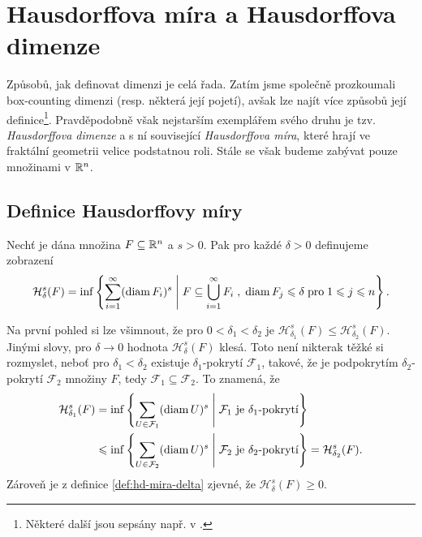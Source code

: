 \section{Hausdorffova míra a Hausdorffova dimenze}\label{sec:hausdorffova-mira-dimenze}

Způsobů, jak definovat dimenzi je celá řada. Zatím jsme společně prozkoumali box-counting dimenzi (resp. některá její pojetí), avšak lze najít více způsobů její definice\footnote{Některé další jsou sepsány např. v \citep[str. 40]{Falconer2014}.}. Pravděpodobně však nejstarším exemplářem svého druhu je tzv. \emph{Hausdorffova dimenze} a s ní související \emph{Hausdorffova míra}, které hrají ve fraktální geometrii velice podstatnou roli. Stále se však budeme zabývat pouze množinami v $\mathbb{R}^n$.

\subsection{Definice Hausdorffovy míry}\label{subsec:hd-mira-definice}

\begin{definition}\label{def:hd-mira-delta}
    Nechť je dána množina $F\subseteq\mathbb{R}^n$ a $s>0$. Pak pro každé $\delta>0$ definujeme zobrazení
    \[\mathcal{H}_\delta^s(F)=\inf\left\{\sum_{i=1}^{\infty}(\operatorname{diam}{F_i})^s\;\middle|\;F\subseteq\bigcup_{i=1}^\infty F_i\;,\;\operatorname{diam}{F_j}\leqslant\delta\;\text{pro}\;1\leqslant j\leqslant n\right\}.\]
\end{definition}
Na první pohled si lze všimnout, že pro $0<\delta_1<\delta_2$ je $\mathcal{H}_{\delta_1}^s(F)\leqslant\mathcal{H}_{\delta_2}^s(F)$. Jinými slovy, pro $\delta\to 0$ hodnota $\mathcal{H}_\delta^s(F)$ klesá. Toto není nikterak těžké si rozmyslet, neboť pro $\delta_1<\delta_2$ existuje $\delta_1$-pokrytí $\mathcal{F}_1$, takové, že je podpokrytím $\delta_2$-pokrytí $\mathcal{F}_2$ množiny $F$, tedy $\mathcal{F}_1\subseteq\mathcal{F}_2$. To znamená, že
\begin{align*}
    \mathcal{H}_{\delta_1}^s(F)&=\inf\left\{\sum_{U\in\mathcal{F}_1}(\operatorname{diam}{U})^s\;\middle|\;\text{$\mathcal{F}_1$ je $\delta_1$-pokrytí}\right\}\\
    &\leqslant\inf\left\{\sum_{U\in\mathcal{F}_2}(\operatorname{diam}{U})^s\;\middle|\;\text{$\mathcal{F}_2$ je $\delta_2$-pokrytí}\right\}=\mathcal{H}_{\delta_2}^s(F).
\end{align*}
Zároveň je z definice \ref{def:hd-mira-delta} zjevné, že $\mathcal{H}_\delta^s(F)\geqslant 0$.

